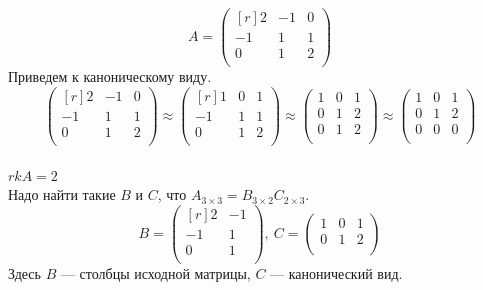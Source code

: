 \documentclass[12pt]{article}
\begin{document}
	\[A = \begin{pmatrix}[r]
	2 & -1 & 0 \\         
	-1 & 1 & 1 \\
	0 & 1 & 2 \\
	\end{pmatrix}\]
	Приведем к каноническому виду.\\
	\[\begin{pmatrix}[r]
	2 & -1 & 0 \\         
	-1 & 1 & 1 \\
	0 & 1 & 2 \\
	\end{pmatrix} \approx \begin{pmatrix}[r]
	1 & 0 & 1 \\         
	-1 & 1 & 1\\
	0 & 1 & 2\\
	\end{pmatrix} \approx \begin{pmatrix}
	1 & 0 & 1 \\         
	0 & 1 & 2 \\
	0 & 1 & 2 \\
	\end{pmatrix} \approx \begin{pmatrix}
	1 & 0 & 1 \\         
	0 & 1 & 2 \\
	0 & 0 & 0 \\
	\end{pmatrix}\]\\
	$rkA=2$\\
	Надо найти такие $B$ и $C$, что $A_{3 \times 3}=B_{3 \times 2}C_{2 \times 3}$.
	\[B = \begin{pmatrix}[r]
	2 & -1 \\         
	-1 & 1 \\
	0 & 1 \\
	\end{pmatrix}, ~ C = \begin{pmatrix}
	1 & 0 & 1 \\         
	0 & 1 & 2 \\
	\end{pmatrix}\]
	Здесь $B$ --- столбцы исходной матрицы, $C$ --- канонический вид.\\ \\
\end{document}
